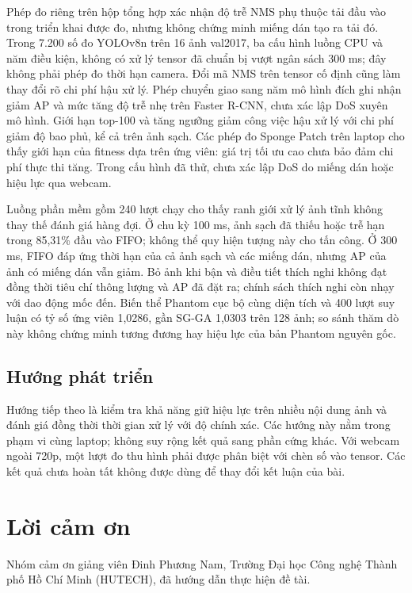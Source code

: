 \documentclass[a4paper,fleqn]{cas-dc}
\begin{document}
Phép đo riêng trên hộp tổng hợp xác nhận độ trễ NMS phụ thuộc tải đầu vào trong triển khai được đo, nhưng không chứng minh miếng dán tạo ra tải đó. Trong 7.200 số đo YOLOv8n trên 16 ảnh val2017, ba cấu hình luồng CPU và năm điều kiện, không có xử lý tensor đã chuẩn bị vượt ngân sách 300 ms; đây không phải phép đo thời hạn camera. Đổi mã NMS trên tensor cố định cũng làm thay đổi rõ chi phí hậu xử lý. Phép chuyển giao sang năm mô hình đích ghi nhận giảm AP và mức tăng độ trễ nhẹ trên Faster R-CNN, chưa xác lập DoS xuyên mô hình. Giới hạn top-100 và tăng ngưỡng giảm công việc hậu xử lý với chi phí giảm độ bao phủ, kể cả trên ảnh sạch. Các phép đo Sponge Patch trên laptop cho thấy giới hạn của fitness dựa trên ứng viên: giá trị tối ưu cao chưa bảo đảm chi phí thực thi tăng. Trong cấu hình đã thử, chưa xác lập DoS do miếng dán hoặc hiệu lực qua webcam.

Luồng phần mềm gồm 240 lượt chạy cho thấy ranh giới xử lý ảnh tĩnh không thay thế đánh giá hàng đợi. Ở chu kỳ 100 ms, ảnh sạch đã thiếu hoặc trễ hạn trong 85,31\% đầu vào FIFO; không thể quy hiện tượng này cho tấn công. Ở 300 ms, FIFO đáp ứng thời hạn của cả ảnh sạch và các miếng dán, nhưng AP của ảnh có miếng dán vẫn giảm. Bỏ ảnh khi bận và điều tiết thích nghi không đạt đồng thời tiêu chí thông lượng và AP đã đặt ra; chính sách thích nghi còn nhạy với dao động mốc đến. Biến thể Phantom cục bộ cùng diện tích và 400 lượt suy luận có tỷ số ứng viên 1,0286, gần SG-GA 1,0303 trên 128 ảnh; so sánh thăm dò này không chứng minh tương đương hay hiệu lực của bản Phantom nguyên gốc.

\subsection{Hướng phát triển}

Hướng tiếp theo là kiểm tra khả năng giữ hiệu lực trên nhiều nội dung ảnh và đánh giá đồng thời thời gian xử lý với độ chính xác. Các hướng này nằm trong phạm vi cùng laptop; không suy rộng kết quả sang phần cứng khác. Với webcam ngoài 720p, một lượt đo thu hình phải được phân biệt với chèn số vào tensor. Các kết quả chưa hoàn tất không được dùng để thay đổi kết luận của bài.

\section*{Lời cảm ơn}

Nhóm cảm ơn giảng viên Đinh Phương Nam, Trường Đại học Công nghệ Thành phố Hồ Chí Minh (HUTECH), đã hướng dẫn thực hiện đề tài.
\end{document}
